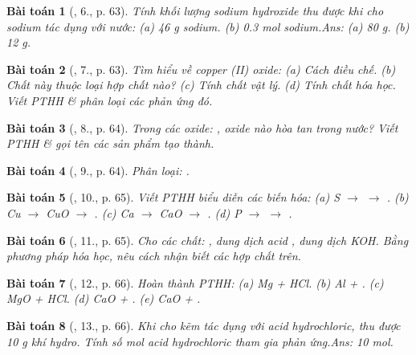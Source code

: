 \documentclass{article}
\newtheorem{baitoan}{Bài toán}
\begin{document}
\begin{baitoan}[\cite{An_Hoa_Hoc_nang_cao_8_9}, 6., p. 63]
	Tính khối lượng sodium hydroxide thu được khi cho sodium tác dụng với nước: (a) {\rm46 g} sodium. (b) {0.3 mol} sodium.\hfill{\sf Ans: (a) 80 g. (b) 12 g.}
\end{baitoan}

\begin{baitoan}[\cite{An_Hoa_Hoc_nang_cao_8_9}, 7., p. 63]
	Tìm hiểu về copper ({\rm II}) oxide: (a) Cách điều chế. (b) Chất này thuộc loại hợp chất nào? (c) Tính chất vật lý. (d) Tính chất hóa học. Viết {\rm PTHH} \& phân loại các phản ứng đó.
\end{baitoan}

\begin{baitoan}[\cite{An_Hoa_Hoc_nang_cao_8_9}, 8., p. 64]
	Trong các oxide: {\rm{}}, oxide nào hòa tan trong nước? Viết {\rm PTHH} \& gọi tên các sản phẩm tạo thành.
\end{baitoan}

\begin{baitoan}[\cite{An_Hoa_Hoc_nang_cao_8_9}, 9., p. 64]
	Phân loại: {\rm{}}.
\end{baitoan}

\begin{baitoan}[\cite{An_Hoa_Hoc_nang_cao_8_9}, 10., p. 65]
	Viết {\rm PTHH} biểu diễn các biến hóa: (a) {\rm S $\to$  $\to$ }. (b) {\rm Cu $\to$ CuO $\to$ }. (c) {\rm Ca $\to$ CaO $\to$ }. (d) {\rm P $\to$  $\to$ }.
\end{baitoan}

\begin{baitoan}[\cite{An_Hoa_Hoc_nang_cao_8_9}, 11., p. 65]
	Cho các chất: {\rm{}}, dung dịch acid {\rm{}}, dung dịch {\rm KOH}. Bằng phương pháp hóa học, nêu cách nhận biết các hợp chất trên.
\end{baitoan}

\begin{baitoan}[\cite{An_Hoa_Hoc_nang_cao_8_9}, 12., p. 66]
	Hoàn thành {\rm PTHH}: (a) {\rm Mg + HCl}. (b) {\rm Al + }. (c) {\rm MgO + HCl}. (d) {\rm CaO + }. (e) {\rm CaO + }.
\end{baitoan}

\begin{baitoan}[\cite{An_Hoa_Hoc_nang_cao_8_9}, 13., p. 66]
	Khi cho kẽm tác dụng với acid hydrochloric, thu được {\rm10 g} khí hydro. Tính số mol acid hydrochloric tham gia phản ứng.\hfill{\sf Ans: 10 mol.}
\end{baitoan}
\end{document}
